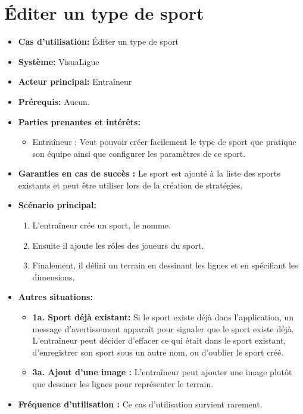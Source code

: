\section{Éditer un type de sport}
\label{sec:ajouter_un_type_de_sport}

\begin{itemize}
    \item \textbf{Cas d'utilisation:} Éditer un type de sport
    \item \textbf{Syst\`eme:} VisuaLigue
    \item \textbf{Acteur principal:} Entra\^ineur
    \item \textbf{Pr\'erequis:} Aucun.
    \item \textbf{Parties prenantes et int\'er\^ets:}
    	\begin{itemize}
    		\item Entraîneur : Veut pouvoir cr\'eer facilement le type de sport que pratique son équipe ainsi que configurer les paramètres de ce sport. 
    	\end{itemize}
    \item \textbf{Garanties en cas de succ\`es :} Le sport est ajout\'e \`a la liste des sports existants et peut \^etre utiliser lors de la cr\'eation de strat\'egies.
    \item \textbf{Sc\'enario principal:}
        \begin{enumerate}
            \item L'entra\^ineur cr\'ee un sport, le nomme.
            \item Ensuite il ajoute les r\^oles des joueurs du sport.
            \item Finalement, il d\'efini un terrain en dessinant les lignes et en sp\'ecifiant les dimensions.
        \end{enumerate}
    \item \textbf{Autres situations:}
    \begin{itemize}
        \item \textbf{1a. Sport d\'ej\`a existant:} Si le sport existe d\'ej\`a dans l'application, un message d'avertissement appara\^it pour signaler que le sport existe d\'ej\`a.
        L'entraîneur peut d\'ecider d'effacer ce qui \'etait dans le sport existant, d'enregistrer son sport sous un autre nom, ou d'oublier le sport cr\'e\'e.
        \item \textbf{3a. Ajout d'une image :} L'entraîneur peut ajouter une image plutôt que dessiner les lignes pour représenter le terrain.
    \end{itemize}
    \item \textbf{Fréquence d'utilisation :} Ce cas d'utilisation survient rarement.
\end{itemize}



